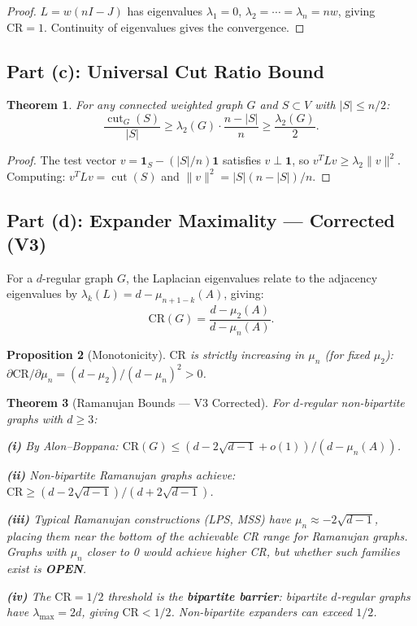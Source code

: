\documentclass[12pt,letterpaper]{article}
\newtheorem{theorem}{Theorem}[section]
\newtheorem{proposition}[theorem]{Proposition}
\newcommand{\One}{\mathbf{1}}
\newcommand{\CR}{\mathrm{CR}}
\newcommand{\cut}{\operatorname{cut}}
\begin{document}
\begin{proof}
$L = w(nI - J)$ has eigenvalues $\lambda_1 = 0$, $\lambda_2 = \cdots = \lambda_n = nw$, giving $\CR = 1$. Continuity of eigenvalues gives the convergence.
\end{proof}

\subsection{Part (c): Universal Cut Ratio Bound}

\begin{theorem}
\label{thm:GUT-c}
For any connected weighted graph $G$ and $S \subset V$ with $|S| \leq n/2$:
\[
  \frac{\cut_G(S)}{|S|} \geq \lambda_2(G) \cdot \frac{n - |S|}{n} \geq \frac{\lambda_2(G)}{2}.
\]
\end{theorem}

\begin{proof}
The test vector $v = \One_S - (|S|/n)\One$ satisfies $v \perp \One$, so $v^T L v \geq \lambda_2 \|v\|^2$. Computing: $v^T L v = \cut(S)$ and $\|v\|^2 = |S|(n - |S|)/n$.
\end{proof}

\subsection{Part (d): Expander Maximality --- Corrected (V3)}

For a $d$-regular graph $G$, the Laplacian eigenvalues relate to the adjacency eigenvalues by $\lambda_k(L) = d - \mu_{n+1-k}(A)$, giving:
\[
  \CR(G) = \frac{d - \mu_2(A)}{d - \mu_n(A)}.
\]

\begin{proposition}[Monotonicity]
\label{prop:mono}
$\CR$ is strictly increasing in $\mu_n$ (for fixed $\mu_2$): $\partial \CR / \partial \mu_n = (d - \mu_2)/(d - \mu_n)^2 > 0$.
\end{proposition}

\begin{theorem}[Ramanujan Bounds --- V3 Corrected]
\label{thm:GUT-d}
For $d$-regular non-bipartite graphs with $d \geq 3$:

\textbf{(i)} By Alon--Boppana: $\CR(G) \leq (d - 2\sqrt{d-1} + o(1))/(d - \mu_n(A))$.

\textbf{(ii)} Non-bipartite Ramanujan graphs achieve: $\CR \geq (d - 2\sqrt{d-1})/(d + 2\sqrt{d-1})$.

\textbf{(iii)} Typical Ramanujan constructions (LPS, MSS) have $\mu_n \approx -2\sqrt{d-1}$, placing them near the \emph{bottom} of the achievable CR range for Ramanujan graphs. Graphs with $\mu_n$ closer to 0 would achieve higher CR, but whether such families exist is \textbf{OPEN}.

\textbf{(iv)} The $\CR = 1/2$ threshold is the \textbf{bipartite barrier}: bipartite $d$-regular graphs have $\lambda_{\max} = 2d$, giving $\CR < 1/2$. Non-bipartite expanders can exceed $1/2$.
\end{theorem}
\end{document}
